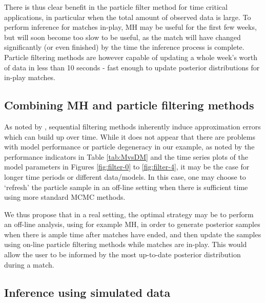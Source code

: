 There is thus clear benefit in the particle filter method for time critical applications, in particular when the total
amount of observed data is large. To perform inference for matches in-play, \gls{MH} may be useful for the first few
weeks, but will soon become too slow to be useful, as the match will have changed significantly (or even finished) by
the time the inference process is complete. Particle filtering methods are however capable of updating a whole week's
worth of data in less than 10 seconds - fast enough to update posterior distributions for in-play matches.

\subsection{Combining MH and particle filtering methods}
\label{sec:Combining_MH_and_particle_filtering_methods}

As noted by \cite{liu2001}, sequential filtering methods inherently induce approximation errors which can build up over
time. While it does not appear that there are problems with model performance or particle degeneracy in our example, as
noted by the performance indicators in Table \ref{tab:MvsDM} and the time series plots of the model parameters in
Figures \ref{fig:filter-0} to \ref{fig:filter-4}, it may be the case for longer time periods or different data/models.
In this case, one may choose to `refresh' the particle sample in an off-line setting when there is sufficient time using
more standard \gls{MCMC} methods.

We thus propose that in a real setting, the optimal strategy may be to perform an off-line analysis, using for example
\gls{MH}, in order to generate posterior samples when there is ample time after matches have ended, and then update the
samples using on-line particle filtering methods while matches are in-play. This would allow the user to be informed by
the most up-to-date posterior distribution during a match.

\subsection{Inference using simulated data}
\label{sec:Inference_using_simulated_data}

